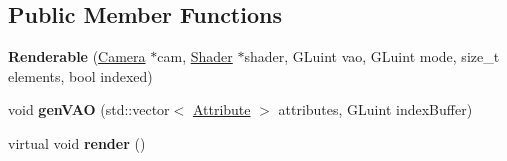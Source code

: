 \subsection*{Public Member Functions}
\begin{DoxyCompactItemize}
\item 
\hypertarget{class_renderable_a337616d887f84c30a13fa9b37dea736a}{}{\bfseries Renderable} (\hyperlink{class_camera}{Camera} $\ast$cam, \hyperlink{class_shader}{Shader} $\ast$shader, G\+Luint vao, G\+Luint mode, size\+\_\+t elements, bool indexed)\label{class_renderable_a337616d887f84c30a13fa9b37dea736a}

\item 
\hypertarget{class_renderable_a1b807ee05938adc9b81ba9b15cfd66d8}{}void {\bfseries gen\+V\+A\+O} (std\+::vector$<$ \hyperlink{class_attribute}{Attribute} $>$ attributes, G\+Luint index\+Buffer)\label{class_renderable_a1b807ee05938adc9b81ba9b15cfd66d8}

\item 
\hypertarget{class_renderable_a1dce45c4703b60fd30acf824c77df9b6}{}virtual void {\bfseries render} ()\label{class_renderable_a1dce45c4703b60fd30acf824c77df9b6}

\end{DoxyCompactItemize}
